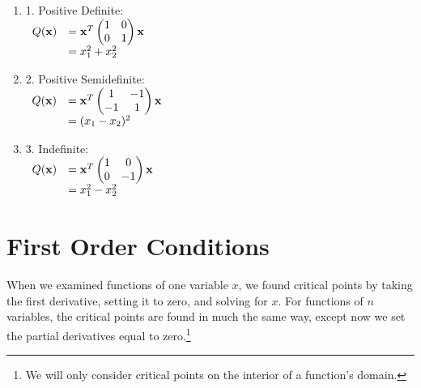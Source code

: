 \documentclass[]{book}
\let\rmarkdownfootnote\footnote%
\def\footnote{\protect\rmarkdownfootnote}
\theoremstyle{definition}
\theoremstyle{definition}
\theoremstyle{definition}
\theoremstyle{remark}
\begin{document}
\begin{enumerate}
  \item[] \parbox[c]{2in}{1. Positive Definite:\\
$ \begin{array}{rl}
Q({\bf x}) &={\bf x}^T \begin{pmatrix} 1&0\\0&1\end{pmatrix} {\bf x} \\
         &=x_1^2+x_2^2
\end{array} $ }

  \item[] \parbox[c]{2in}{2. Positive Semidefinite:\\

$ \begin{array}{rl}
Q({\bf x})&={\bf x}^T \begin{pmatrix} 1&-1\\-1&1\end{pmatrix} {\bf x} \\
       &=(x_1-x_2)^2
\end{array} $ }

  \item[] \parbox[c]{2in}{3. Indefinite:\\

$ \begin{array}{rl}
Q({\bf x})&={\bf x}^T \begin{pmatrix} 1&0\\0&-1\end{pmatrix} {\bf x} \\
       &=x_1^2-x_2^2
       \end{array} $ }

\end{enumerate}

\section{First Order Conditions}\label{first-order-conditions}

When we examined functions of one variable \(x\), we found critical
points by taking the first derivative, setting it to zero, and solving
for \(x\). For functions of \(n\) variables, the critical points are
found in much the same way, except now we set the partial derivatives
equal to zero.\footnote{We
will only consider critical points on the interior of a function's
domain.}
\end{document}
